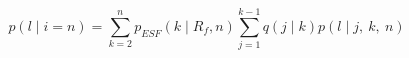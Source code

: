 \documentclass[a4paper,10pt]{article}
\newcommand{\gc}[1]{{\it \color{red} (#1)} }
\begin{document}
\begin{equation}
	p(l \mid i=n) =  \sum_{k=2}^{n}  p_{ESF}(k \mid R_f,n)  \sum_{j=1}^{k-1} q(j\mid k) p(l \mid j,~k, ~n)
\end{equation}
%
\end{document}
